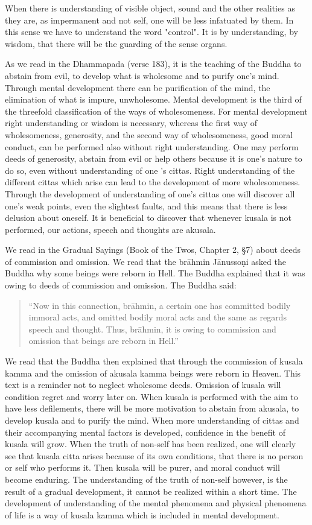 \documentclass{book}
\begin{document}
When there is understanding of visible object, sound and the other
realities as they are, as impermanent and not self, one will be less
infatuated by them. In this sense we have to understand the word 
"control". It is by understanding, by wisdom, that there will be the guarding of the sense organs.

As we read in the Dhammapada (verse 183), it is the teaching of the
Buddha to abstain from evil, to develop what is wholesome and to purify
one's mind. Through mental development there can be purification of the
mind, the elimination of what is impure, unwholesome. Mental development
is the third of the threefold classification of the ways of
wholesomeness. For mental development right understanding or wisdom is
necessary, whereas the first way of wholesomeness, generosity, and the
second way of wholesomeness, good moral conduct, can be performed also
without right understanding. One may perform deeds of generosity,
abstain from evil or help others because it is one's nature to do so,
even without understanding of one 's cittas. Right under­standing of     the different cittas which arise can lead to the development of more wholesomeness. Through the development of understanding of one's cittas  one will discover all one's weak points, even the slightest faults, and this means that there is less delusion about oneself. It is beneficial 
to discover that whenever kusala is not performed, our actions, speech and thoughts are akusala.

We read in the Gradual Sayings (Book of the Twos, Chapter 2, §7) about
deeds of commission and omission. We read that the brāhmin Jānussoṇi
asked the Buddha why some beings were reborn in Hell. The Buddha
explained that it was owing to deeds of commission and omission. The
Buddha said:

\begin{quote}
``Now in this connection, brāhmin, a certain one has committed bodily
immoral acts, and omitted bodily moral acts and the same as regards
speech and thought. Thus, brāhmin, it is owing to commission and
omission that beings are reborn in Hell.''
\end{quote}

We read that the Buddha then explained that through the commission of
kusala kamma and the omission of akusala kamma beings were reborn in
Heaven. This text is a reminder not to neglect wholesome deeds. Omission  of kusala will condition regret and worry later on. When kusala is performed with the aim to have less defilements, there will be more motivation to abstain from akusala, to develop kusala and to purify the mind. When more understanding of cittas and their accompanying mental factors is developed, confidence in the benefit of kusala will grow.    When the truth of non-self has been realized, one will clearly see that kusala citta arises because of its own conditions, that there is no   person or self who performs it. Then kusala will be purer, and moral conduct will become enduring. The under­standing of the truth of       non-self however, is the result of a gradual development, it cannot be realized within a short time. The development of understanding of the mental phenomena and physical phenomena of life is a way of kusala 
kamma which is included in mental development.
\end{document}
